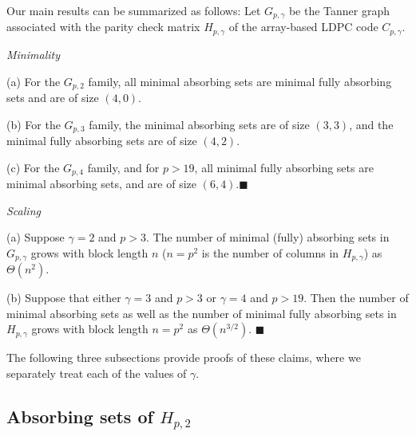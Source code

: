 Our main results can be summarized as follows: Let $G_{p,\gamma}$
be the Tanner graph associated with the parity check matrix
$H_{p,\gamma}$ of the array-based LDPC code $C_{p,\gamma}$.
\begin{theorem}\label{theo1}\emph{Minimality}

(a) For the $G_{p,2}$ family, all minimal absorbing sets are
minimal fully absorbing sets and are of size $(4,0)$.

(b) For the $G_{p,3}$ family, the minimal absorbing sets are of
size $(3,3)$, and the minimal fully absorbing sets are of size
$(4,2)$.

(c) For the $G_{p,4}$ family, and for $p>19$, all minimal fully
absorbing sets are minimal absorbing sets, and are of size
$(6,4)$.\hfill$\blacksquare$
\end{theorem}
\begin{theorem}\label{theo2}\emph{Scaling}

(a) Suppose $\gamma=2$ and $p>3$. The number of minimal (fully)
absorbing sets in $G_{p,\gamma}$ grows with block length $n$
($n=p^2$ is the number of columns in $H_{p,\gamma}$) as
$\Theta(n^{2})$.

(b) Suppose that either $\gamma =3$ and $p
>3$ or $\gamma=4$ and $p > 19$. Then the number of minimal absorbing sets as well
as the number of minimal fully absorbing sets in $H_{p,\gamma}$
grows with block length $n=p^2$ as $\Theta(n^{3/2})$.
\hfill$\blacksquare$
\end{theorem}

The following three subsections provide proofs of these claims,
where we separately treat each of the values of $\gamma$.

\vspace{-0.00in}\subsection{Absorbing sets of
$H_{p,2}$}\label{theo12}

